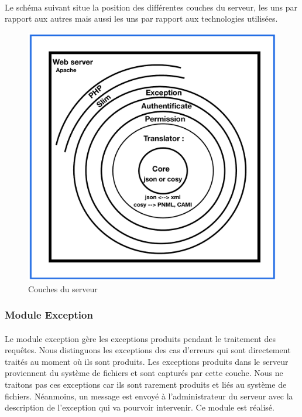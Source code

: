 \documentclass{report}
\begin{document}
\paragraph{}
Le schéma suivant situe la position des différentes couches du serveur, les uns par rapport aux autres mais aussi les 
uns par rapport aux technologies utilisées.

\newpage

\begin{figure}[h!]
     \centering
     \includegraphics[scale=0.60]{img/server_couches.pdf}
     \caption{Couches du serveur}
\end{figure}

\subsubsection{Module Exception}

\paragraph{} 
Le module exception gère les exceptions produits pendant le traitement des requêtes. Nous distinguons les 
exceptions des cas d'erreurs qui sont directement traités au moment où ils sont produits. Les exceptions produits dans
le serveur proviennent du système de fichiers et sont capturés par cette couche. Nous ne traitons pas ces exceptions car
ils sont rarement produits et liés au système de fichiers. Néanmoins, un message est envoyé à l'administrateur du serveur
avec la description de l'exception qui va pourvoir intervenir. Ce module est réalisé.
\end{document}
